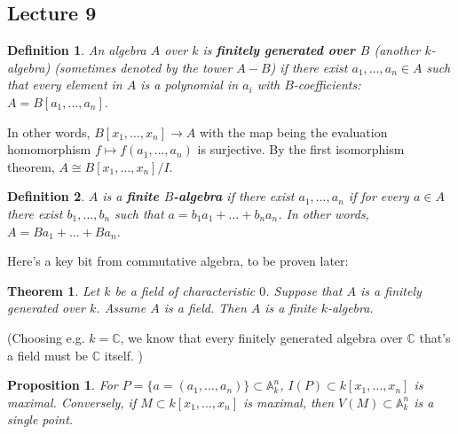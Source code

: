\documentclass[12pt]{article}
\newcommand{\C}{\mathbb{C}}
\newcommand{\A}{\mathbb{A}}
\newtheorem{definition}{Definition}[section]
\newtheorem{theorem}{Theorem}[section]
\newtheorem{proposition}{Proposition}[section]
\begin{document}
    \subsection{Lecture 9}
    \begin{definition}
        An algebra $A$ over $k$ is \textbf{finitely generated over $B$} (another $k$-algebra) (sometimes denoted by the tower $A - B$) if there exist $a_1, \dots, a_n \in A$ such that every element in $A$ is a polynomial in $a_i$ with $B$-coefficients: $A = B[a_1, \dots, a_n]$.
    \end{definition}
    In other words, $B[x_1, \dots, x_n] \to A$ with the map being the evaluation homomorphism $f \mapsto f(a_1, \dots, a_n)$ is surjective. By the first isomorphism theorem, $A \cong B[x_1, \dots, x_n]/I$.
    \begin{definition}
        $A$ is a \textbf{finite $B$-algebra} if there exist $a_1, \dots, a_n$ if for every $a \in A$ there exist $b_1, \dots, b_n$ such that $a = b_1a_1 + \dots + b_na_n$. In other words, $A = Ba_1 + \dots + Ba_n$.
    \end{definition}
    Here's a key bit from commutative algebra, to be proven later:
    \begin{theorem} \label{thm:fin_if_fin_alg}
        Let $k$ be a field of characteristic $0$. Suppose that $A$ is a finitely generated over $k$. Assume $A$ is a field. Then $A$ is a finite $k$-algebra.
    \end{theorem}
    (Choosing e.g. $k = \C$, we know that every finitely generated algebra over $\C$ that's a field must be $\C$ itself. )\par
    \begin{proposition}
        For $P = \{a = (a_1, \dots, a_n)\} \subset \A^n_k$, $I(P) \subset k[x_1, \dots, x_n]$ is maximal. Conversely, if $M \subset k[x_1, \dots, x_n]$ is maximal, then $V(M) \subset \A^n_k$ is a single point.
    \end{proposition}
\end{document}
